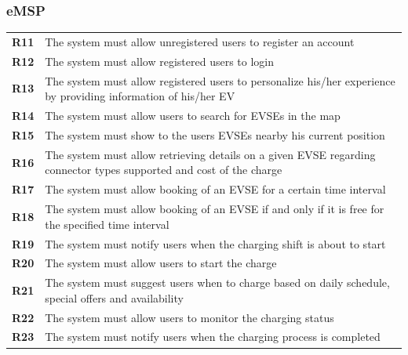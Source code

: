 \subsubsection{eMSP}
\begin{table}[H]
    \begin{tabularx}{\textwidth}{cX}
        \toprule
        \textbf{R11} & The system must allow unregistered users to register an account                                                     \\
        \textbf{R12} & The system must allow registered users to login                                                                     \\
        \textbf{R13} & The system must allow registered users to personalize his/her experience by providing information of his/her EV     \\
        \textbf{R14} & The system must allow users to search for EVSEs in the map                                                          \\
        \textbf{R15} & The system must show to the users EVSEs nearby his current position                                                 \\
        \textbf{R16} & The system must allow retrieving details on a given EVSE regarding connector types supported and cost of the charge \\
        \textbf{R17} & The system must allow booking of an EVSE for a certain time interval                                                \\
        \textbf{R18} & The system must allow booking of an EVSE if and only if it is free for the specified time interval                  \\
        \textbf{R19} & The system must notify users when the charging shift is about to start                                              \\
        \textbf{R20} & The system must allow users to start the charge                                                                     \\
        \textbf{R21} & The system must suggest users when to charge based on daily schedule, special offers and availability               \\
        \textbf{R22} & The system must allow users to monitor the charging status                                                          \\
        \textbf{R23} & The system must notify users when the charging process is completed                                                 \\

\end{tabularx}
\end{table}
